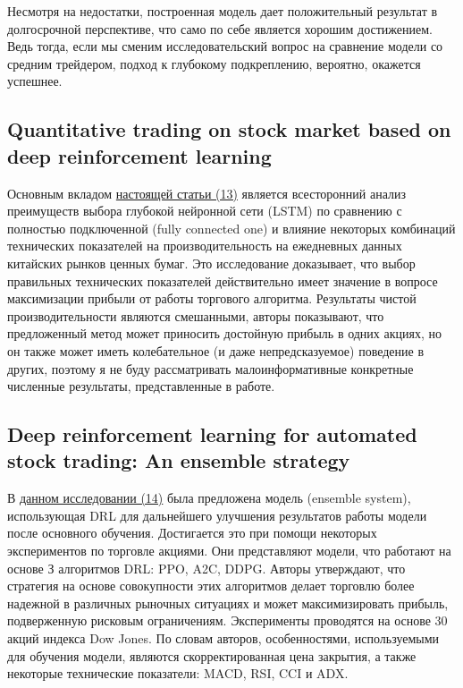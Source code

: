 \documentclass[a4paper,14pt]{extarticle}
\newcommand{\bibref}[3]{\hyperlink{#1}{#2 (#3)}} %
\begin{document}
Несмотря на недостатки,  построенная модель дает положительный результат в долгосрочной перспективе, что само по себе является хорошим достижением. Ведь тогда, если мы сменим исследовательский вопрос на сравнение модели со средним трейдером, подход к глубокому подкреплению, вероятно, окажется успешнее.


\subsection{Quantitative trading on stock market based on deep reinforcement learning}

Основным вкладом  \bibref{13}{настоящей статьи}{13} является всесторонний анализ преимуществ выбора глубокой нейронной сети (LSTM) по сравнению с полностью подключенной (fully connected one) и влияние некоторых комбинаций технических показателей на производительность на ежедневных данных китайских рынков ценных бумаг. Это исследование доказывает, что выбор правильных технических показателей действительно имеет значение в вопросе максимизации прибыли от работы торгового алгоритма. Результаты чистой производительности являются смешанными, авторы показывают, что предложенный метод может приносить достойную прибыль в одних акциях, но он также может иметь колебательное (и даже непредсказуемое) поведение в других, поэтому я не буду рассматривать малоинформативные конкретные численные результаты, представленные в работе.

\subsection{Deep reinforcement learning for automated stock trading: An ensemble strategy}

В \bibref{14}{данном исследовании}{14} была предложена модель (ensemble system), использующая DRL для дальнейшего улучшения результатов работы модели после основного обучения. Достигается это при помощи некоторых экспериментов по торговле акциями. Они представляют модели, что работают на основе З алгоритмов DRL: PPO, A2C, DDPG. Авторы утверждают, что стратегия на основе совокупности этих алгоритмов делает торговлю более надежной в различных рыночных ситуациях и может максимизировать прибыль, подверженную рисковым ограничениям. Эксперименты проводятся на основе 30 акций индекса Dow Jones. По словам авторов, особенностями, используемыми для обучения модели, являются скорректированная цена закрытия, а также некоторые технические показатели: MACD, RSI, CCI и ADX.
\end{document}
